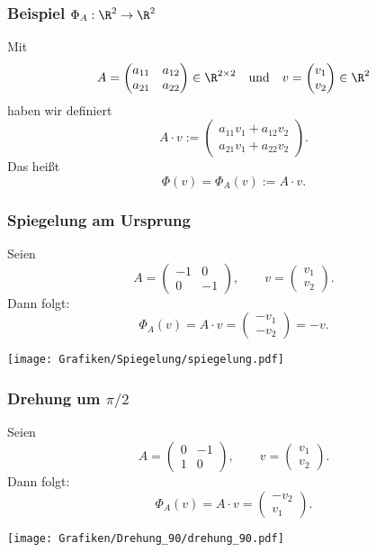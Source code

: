 %
%
\begin{frame}\frametitle{Beispiel $\Phi_A: \R^2\to \R^2$}

	Mit 
	$$
		A =
		\begin{pmatrix}
			a_{11} 	& a_{12}	\\
			a_{21}	& a_{22}	
		\end{pmatrix}
		\in \R^{2 \times 2}
		\quad
		\text{und} 
		\quad
		v = 
		\begin{pmatrix}
			v_1	\\
			v_2	
		\end{pmatrix}
		\in\R^2
	$$
	haben wir definiert
	$$
		A\cdot v
		:=
		\begin{pmatrix}
			a_{11}v_1 + a_{12}v_2	\\
			a_{21}v_1 + a_{22}v_2	
		\end{pmatrix}.
	$$ \pause
	Das hei{\ss}t
	$$
		\Phi(v) = \Phi_A(v) := A\cdot v.
	$$

\end{frame}
%
%
\begin{frame}\frametitle{Spiegelung am Ursprung}
	
	\vspace{2mm}
	Seien
	$$
		A=
		\begin{pmatrix}
			-1	&	0	\\
			0	&	-1
		\end{pmatrix},
		\qquad
		v =
		\begin{pmatrix}
			v_1\\
			v_2
		\end{pmatrix}.
	$$
	Dann folgt:
	$$
		\Phi_A(v) = A\cdot v =
		\begin{pmatrix}
			-v_1\\
			-v_2
		\end{pmatrix} 
		=
		-v.
	$$
	
	
	\vspace{5mm}
	\begin{center}
		\texttt{[image: Grafiken/Spiegelung/spiegelung.pdf]}
	\end{center}

\end{frame}
%
%
\begin{frame}\frametitle{Drehung um $\pi/2$}
	
	\vspace{2mm}
	Seien
	$$
		A=
		\begin{pmatrix}
			0	&	-1	\\
			1	&	0
		\end{pmatrix},
		\qquad
		v =
		\begin{pmatrix}
			v_1\\
			v_2
		\end{pmatrix}.
	$$
	Dann folgt:
	$$
		\Phi_A(v) = A\cdot v =
		\begin{pmatrix}
			-v_2\\
			v_1
		\end{pmatrix}.
	$$
	
	\vspace{5mm}
	\begin{center}
		\texttt{[image: Grafiken/Drehung\_90/drehung\_90.pdf]}
	\end{center}

\end{frame}
